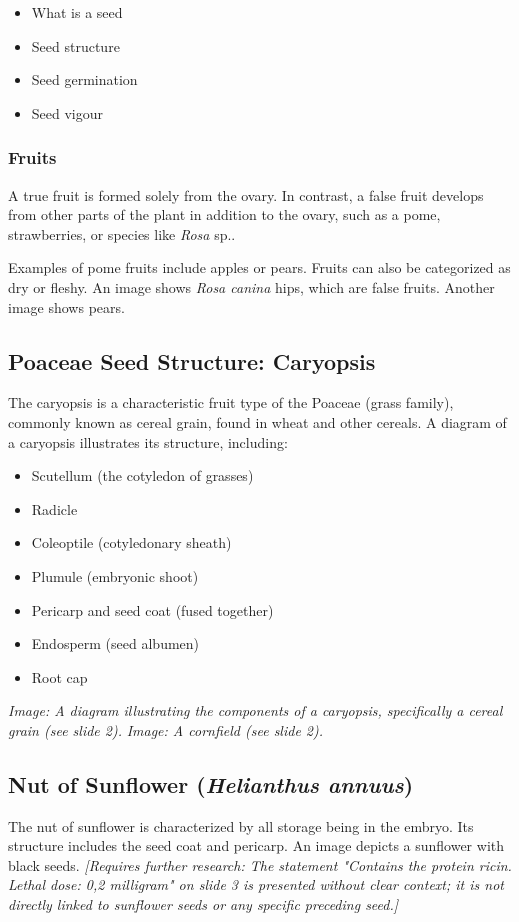\begin{itemize} 
    \item What is a seed 
    \item Seed structure 
    \item Seed germination 
    \item Seed vigour 
\end{itemize}

\subsubsection{Fruits} 
A true fruit is formed solely from the ovary. In contrast, a false fruit develops from other parts of the plant in addition to the ovary, such as a pome, strawberries, or species like \textit{Rosa} sp.. 

Examples of pome fruits include apples or pears. Fruits can also be categorized as dry or fleshy. An image shows \textit{Rosa canina} hips, which are false fruits. Another image shows pears.

\subsection{Poaceae Seed Structure: Caryopsis} 
The caryopsis is a characteristic fruit type of the Poaceae (grass family), commonly known as cereal grain, found in wheat and other cereals. A diagram of a caryopsis illustrates its structure, including: 

\begin{itemize} 
    \item Scutellum (the cotyledon of grasses) 
    \item Radicle 
    \item Coleoptile (cotyledonary sheath) 
    \item Plumule (embryonic shoot) 
    \item Pericarp and seed coat (fused together) 
    \item Endosperm (seed albumen) 
    \item Root cap 
\end{itemize} 

\textit{Image: A diagram illustrating the components of a caryopsis, specifically a cereal grain (see slide 2).} \textit{Image: A cornfield (see slide 2).}

\subsection{Nut of Sunflower (\textit{Helianthus annuus})} 
The nut of sunflower is characterized by all storage being in the embryo. Its structure includes the seed coat and pericarp. An image depicts a sunflower with black seeds. \textit{[Requires further research: The statement "Contains the protein ricin. Lethal dose: 0,2 milligram" on slide 3 is presented without clear context; it is not directly linked to sunflower seeds or any specific preceding seed.]}

